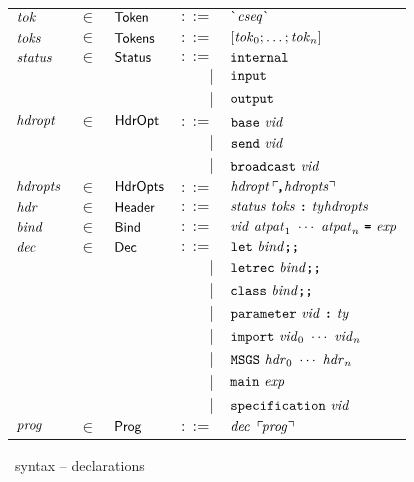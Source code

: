 \documentclass[final]{article}
\begin{document}
\begin{figure}[t]
\begin{small}
\begin{center}
  \begin{tabular}{lllrl}
    $\mathit{tok}$
    & $\in$
    & $\mathsf{Token}$
    & $::=$
    & $\CONSatom{\METAcharseq}$
    \\

    $\mathit{toks}$
    & $\in$
    & $\mathsf{Tokens}$
    & $::=$
    & $[\mathit{tok}_0;\dots;\mathit{tok}_n]$
    \\

    $\mathit{status}$
    & $\in$
    & $\mathsf{Status}$
    & $::=$
    & $\mathtt{internal}$\\
    &&& $\mid$
    & $\mathtt{input}$\\
    &&& $\mid$
    & $\mathtt{output}$
    \\

    $\mathit{hdropt}$
    & $\in$
    & $\mathsf{HdrOpt}$
    & $::=$
    & $\mathtt{base}\ \mathit{vid}$\\
    &&& $\mid$
    & $\mathtt{send}\ \mathit{vid}$\\
    &&& $\mid$
    & $\mathtt{broadcast}\ \mathit{vid}$
    \\

    $\mathit{hdropts}$
    & $\in$
    & $\mathsf{HdrOpts}$
    & $::=$
    & $\mathit{hdropt}\,\ulcorner\!\textbf{\texttt{,}}\mathit{hdropts}\urcorner$
    \\

    $\mathit{hdr}$
    & $\in$
    & $\mathsf{Header}$
    & $::=$
    & $\mathit{status}\ \mathit{toks}\ \textbf{\texttt{:}}\ \mathit{ty}{\mathit{hdropts}}$
    \\

    $\mathit{bind}$
    & $\in$
    & $\mathsf{Bind}$
    & $::=$
    & $\mathit{vid}\ \mathit{atpat}_1\ \cdots\ \mathit{atpat}_n\ \textbf{\texttt{=}}\ \mathit{exp}$
    \\

    $\mathit{dec}$
    & $\in$
    & $\mathsf{Dec}$
    & $::=$
    & $\mathtt{let}\ \mathit{bind}\textbf{\texttt{;}}\textbf{\texttt{;}}$\\
    &&& $\mid$
    & $\mathtt{letrec}\ \mathit{bind}\textbf{\texttt{;}}\textbf{\texttt{;}}$\\
    &&& $\mid$
    & $\mathtt{class}\ \mathit{bind}\textbf{\texttt{;}}\textbf{\texttt{;}}$\\
    &&& $\mid$
    & $\mathtt{parameter}\ \mathit{vid}\ \textbf{\texttt{:}}\ \mathit{ty}$\\
    &&& $\mid$
    & $\mathtt{import}\ \mathit{vid}_0\ \cdots\ \mathit{vid}_n$\\
    &&& $\mid$
    & $\mathtt{MSGS}\ \mathit{hdr}_0\ \cdots\ \mathit{hdr}_n$\\
    &&& $\mid$
    & $\mathtt{main}\ \mathit{exp}$\\
    &&& $\mid$
    & $\mathtt{specification}\ \mathit{vid}$
    \\


    $\mathit{prog}$
    & $\in$
    & $\mathsf{Prog}$
    & $::=$
    & $\mathit{dec}\ \,\ulcorner\!\mathit{prog}\urcorner$
  \end{tabular}
\end{center}
\caption{\eml\ syntax -- declarations}
\label{fig:emlsyntax2}
\end{small}
\end{figure}
\end{document}
